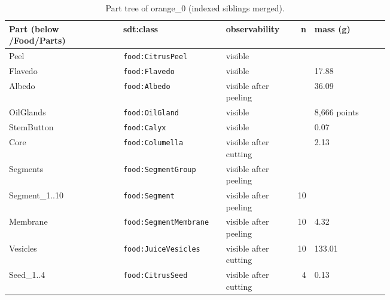 \documentclass[10.5pt,a4paper]{article}
\begin{document}
\begin{table}[htbp]\centering\scriptsize\caption{Part tree of orange\_0 (indexed siblings merged).}
\begin{tabularx}{\linewidth}{@{}p{0.30\linewidth}p{0.27\linewidth}p{0.17\linewidth}rX@{}}\toprule Part (below /Food/Parts) & sdt:class & observability & n & mass (g) \\\midrule
\hspace*{0.0em}Peel & \texttt{food:CitrusPeel} & visible &  &  \\
\hspace*{0.9em}Flavedo & \texttt{food:Flavedo} & visible &  & 17.88 \\
\hspace*{0.9em}Albedo & \texttt{food:Albedo} & visible after peeling &  & 36.09 \\
\hspace*{0.9em}OilGlands & \texttt{food:OilGland} & visible &  & 8,666 points \\
\hspace*{0.0em}StemButton & \texttt{food:Calyx} & visible &  & 0.07 \\
\hspace*{0.0em}Core & \texttt{food:Columella} & visible after cutting &  & 2.13 \\
\hspace*{0.0em}Segments & \texttt{food:SegmentGroup} & visible after peeling &  &  \\
\hspace*{0.9em}Segment\_1..10 & \texttt{food:Segment} & visible after peeling & 10 &  \\
\hspace*{1.8em}Membrane & \texttt{food:SegmentMembrane} & visible after peeling & 10 & 4.32 \\
\hspace*{1.8em}Vesicles & \texttt{food:JuiceVesicles} & visible after cutting & 10 & 133.01 \\
\hspace*{1.8em}Seed\_1..4 & \texttt{food:CitrusSeed} & visible after cutting & 4 & 0.13 \\\bottomrule\end{tabularx}\end{table}
\end{document}
